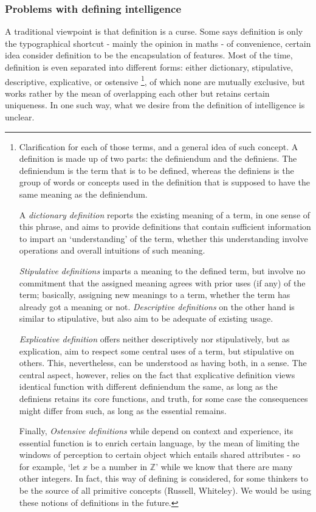 \subsubsection{Problems with defining intelligence}
A traditional viewpoint is that definition is a curse. Some says definition is only the typographical shortcut - mainly the opinion in maths - of convenience, certain idea consider definition to be the encapsulation of features. Most of the time, definition is even separated into different forms: either dictionary, stipulative, descriptive, explicative, or ostensive \footnote{Clarification for each of those terms, and a general idea of such concept. A definition is made up of two parts: the definiendum and the definiens. The definiendum is the term that is to be defined, whereas the definiens is the group of words or concepts used in the definition that is supposed to have the same meaning as the definiendum. 

A \textit{dictionary definition} reports the existing meaning of a term, in one sense of this phrase, and aims to provide definitions that contain sufficient information to impart an `understanding' of the term, whether this understanding involve operations and overall intuitions of such meaning. 

\textit{Stipulative definitions} imparts a meaning to the defined term, but involve no commitment that the assigned meaning agrees with prior uses (if any) of the term; basically, assigning new meanings to a term, whether the term has already got a meaning or not. \textit{Descriptive definitions} on the other hand is similar to stipulative, but also aim to be adequate of existing usage. 

\textit{Explicative definition} offers neither descriptively nor stipulatively, but as explication, aim to respect some central uses of a term, but stipulative on others. This, nevertheless, can be understood as having both, in a sense. The central aspect, however, relies on the fact that explicative definition views identical function with different definiendum the same, as long as the definiens retains its core functions, and truth, for some case the consequences might differ from such, as long as the essential remains. 

Finally, \textit{Ostensive definitions} while depend on context and experience, its essential function is to enrich certain language, by the mean of limiting the windows of perception to certain object which entails shared attributes - so for example, `let $x$ be a number in $\mathbb{Z}$' while we know that there are many other integers. In fact, this way of defining is considered, for some thinkers to be the source of all primitive concepts (Russell, Whiteley). We would be using these notions of definitions in the future.}, of which none are mutually exclusive, but works rather by the mean of overlapping each other but retains certain uniqueness. In one such way, what we desire from the definition of intelligence is unclear. 

